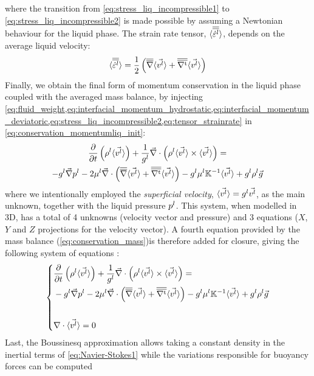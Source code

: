 where the transition from \cref{eq:stress_liq_incompressible1} to \cref{eq:stress_liq_incompressible2} is made
possible by assuming a Newtonian behaviour for the liquid phase. The strain rate tensor, $\langle {\overline{\overline{\dot{\varepsilon}^l}}} \rangle$, depends on 
the average liquid velocity:
\begin{align}
\label{eq:tensor_strainrate}
\langle {\overline{\overline{\dot{\varepsilon}^l}}} \rangle = \frac{1}{2} \left( {\overline{\overline{\nabla}}} \langle \vec{v^l} \rangle  +  {\overline{\overline{\nabla^\text{t}}}} \langle \vec{v^l} \rangle \right)
\end{align}
Finally, we obtain the final form of momentum conservation in the liquid phase coupled with the averaged mass balance, by injecting \cref{eq:fluid_weight,eq:interfacial_momentum_hydrostatic,eq:interfacial_momentum_deviatoric,eq:stress_liq_incompressible2,eq:tensor_strainrate}
in \cref{eq:conservation_momentumliq_init}:
\begin{multline}
\label{eq:conservation_momentumliq}
 \frac{\partial}{\partial t} \left(  \rho^l \langle \vec{v^l} \rangle  \right)  + \frac{1}{{g^l}} \vec{\nabla} \cdot \left( \rho^l \langle \vec{v^l} \rangle \times \langle \vec{v^l} \rangle \right) = \\
	  - {g^l}\vec{\nabla} {p^l} - 2 \mu^l \vec{\nabla} \cdot \left( {\overline{\overline{\nabla}}} \langle \vec{v^l} \rangle + {\overline{\overline{\nabla^\text{t}}}} \langle \vec{v^l} \rangle \right)
	  - {g^l} \mu^l \mathbb{K}^{-1} \langle \vec{v^l} \rangle + {g^l} \rho^l \vec{g}
\end{multline}
where we intentionally employed the \emph{superficial velocity}, $\langle \vec{v^l} \rangle = {g^l} \vec{v^l}$, as the main unknown, together with the liquid pressure ${p^l}$.
This system, when modelled in 3D, has a total of 4 unknowns (velocity vector and pressure) and 3 equations ($X$,$Y$ and $Z$ projections for the velocity vector).
A fourth equation provided by the mass balance (\cref{eq:conservation_mass})is therefore added for closure, giving the following system of equations :
\begin{equation}
\label{eq:Navier-Stokes1}
   \left\{
   \begin{aligned}
      & \frac{\partial}{\partial t} \left(  \rho^l \langle \vec{v^l} \rangle  \right)  + \frac{1}{{g^l}} \vec{\nabla} \cdot \left( \rho^l \langle \vec{v^l} \rangle \times \langle \vec{v^l} \rangle \right) = \\
	  &- {g^l}\vec{\nabla} {p^l} - 2 \mu^l \vec{\nabla} \cdot \left( {\overline{\overline{\nabla}}} \langle \vec{v^l} \rangle + {\overline{\overline{\nabla^\text{t}}}} \langle \vec{v^l} \rangle \right)
	  - {g^l} \mu^l \mathbb{K}^{-1} \langle \vec{v^l} \rangle + {g^l} \rho^l \vec{g}\\ \\
      & \nabla \cdot \langle \vec{v^l} \rangle =0
    \end{aligned}
    \right.
\end{equation}
Last, the Boussinesq approximation allows taking a constant density in the inertial terms of \cref{eq:Navier-Stokes1} while the variations responsible for buoyancy forces can be computed
